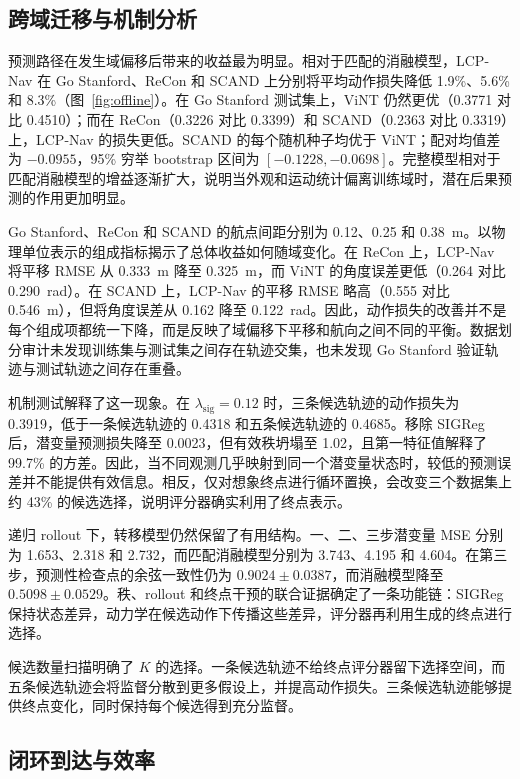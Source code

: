 \documentclass[conference]{IEEEtran}
\begin{document}
\subsection{跨域迁移与机制分析}

预测路径在发生域偏移后带来的收益最为明显。相对于匹配的消融模型，LCP-Nav 在 Go Stanford、ReCon 和 SCAND 上分别将平均动作损失降低 1.9\%、5.6\% 和 8.3\%（图~\ref{fig:offline}）。在 Go Stanford 测试集上，ViNT 仍然更优（0.3771 对比 0.4510）；而在 ReCon（0.3226 对比 0.3399）和 SCAND（0.2363 对比 0.3319）上，LCP-Nav 的损失更低。SCAND 的每个随机种子均优于 ViNT；配对均值差为 $-0.0955$，95\% 穷举 bootstrap 区间为 $[-0.1228,-0.0698]$。完整模型相对于匹配消融模型的增益逐渐扩大，说明当外观和运动统计偏离训练域时，潜在后果预测的作用更加明显。

Go Stanford、ReCon 和 SCAND 的航点间距分别为 0.12、0.25 和 0.38~m。以物理单位表示的组成指标揭示了总体收益如何随域变化。在 ReCon 上，LCP-Nav 将平移 RMSE 从 0.333~m 降至 0.325~m，而 ViNT 的角度误差更低（0.264 对比 0.290~rad）。在 SCAND 上，LCP-Nav 的平移 RMSE 略高（0.555 对比 0.546~m），但将角度误差从 0.162 降至 0.122~rad。因此，动作损失的改善并不是每个组成项都统一下降，而是反映了域偏移下平移和航向之间不同的平衡。数据划分审计未发现训练集与测试集之间存在轨迹交集，也未发现 Go Stanford 验证轨迹与测试轨迹之间存在重叠。

机制测试解释了这一现象。在 $\lambda_{\mathrm{sig}}=0.12$ 时，三条候选轨迹的动作损失为 0.3919，低于一条候选轨迹的 0.4318 和五条候选轨迹的 0.4685。移除 SIGReg 后，潜变量预测损失降至 0.0023，但有效秩坍塌至 1.02，且第一特征值解释了 99.7\% 的方差。因此，当不同观测几乎映射到同一个潜变量状态时，较低的预测误差并不能提供有效信息。相反，仅对想象终点进行循环置换，会改变三个数据集上约 43\% 的候选选择，说明评分器确实利用了终点表示。

递归 rollout 下，转移模型仍然保留了有用结构。一、二、三步潜变量 MSE 分别为 1.653、2.318 和 2.732，而匹配消融模型分别为 3.743、4.195 和 4.604。在第三步，预测性检查点的余弦一致性仍为 $0.9024\pm0.0387$，而消融模型降至 $0.5098\pm0.0529$。秩、rollout 和终点干预的联合证据确定了一条功能链：SIGReg 保持状态差异，动力学在候选动作下传播这些差异，评分器再利用生成的终点进行选择。

候选数量扫描明确了 $K$ 的选择。一条候选轨迹不给终点评分器留下选择空间，而五条候选轨迹会将监督分散到更多假设上，并提高动作损失。三条候选轨迹能够提供终点变化，同时保持每个候选得到充分监督。

\subsection{闭环到达与效率}
\end{document}
